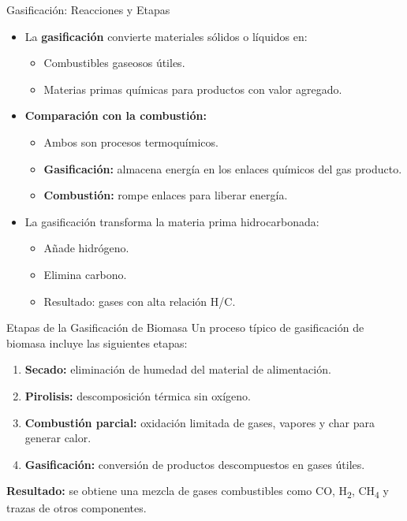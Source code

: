 \documentclass[../../main.tex]{subfiles}
\begin{document}
\begin{frame}{Gasificación: Reacciones y Etapas}
\small
\begin{itemize}
  \item La \textbf{gasificación} convierte materiales sólidos o líquidos en:
  \begin{itemize}
    \item Combustibles gaseosos útiles.
    \item Materias primas químicas para productos con valor agregado.
  \end{itemize}
  \item \textbf{Comparación con la combustión:}
  \begin{itemize}
    \item Ambos son procesos termoquímicos.
    \item \textbf{Gasificación:} almacena energía en los enlaces químicos del gas producto.
    \item \textbf{Combustión:} rompe enlaces para liberar energía.
  \end{itemize}
  \item La gasificación transforma la materia prima hidrocarbonada:
  \begin{itemize}
    \item Añade hidrógeno.
    \item Elimina carbono.
    \item Resultado: gases con alta relación H/C.
  \end{itemize}
\end{itemize}
\end{frame}
\begin{frame}{Etapas de la Gasificación de Biomasa}
\small
Un proceso típico de gasificación de biomasa incluye las siguientes etapas:

\vspace{0.5em}
\begin{enumerate}
  \item \textbf{Secado:} eliminación de humedad del material de alimentación.
  \item \textbf{Pirolisis:} descomposición térmica sin oxígeno.
  \item \textbf{Combustión parcial:} oxidación limitada de gases, vapores y char para generar calor.
  \item \textbf{Gasificación:} conversión de productos descompuestos en gases útiles.
\end{enumerate}

\vspace{0.5em}
\textbf{Resultado:} se obtiene una mezcla de gases combustibles como CO, H\textsubscript{2}, CH\textsubscript{4} y trazas de otros componentes.
\end{frame}
\end{document}
